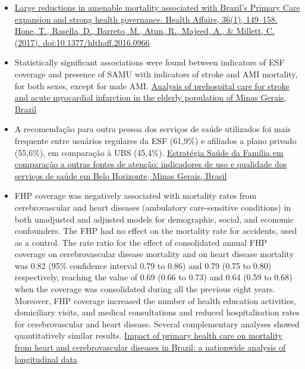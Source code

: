 \documentclass[]{book}
\begin{document}
\begin{itemize}
\item
  \href{https://www.healthaffairs.org/doi/full/10.1377/hlthaff.2016.0966?url_ver=Z39.88-2003\&rfr_id=ori:rid:crossref.org\&rfr_dat=cr_pub\%3dpubmed}{Large reductions in amenable mortality associated with Brazil's Primary Care expansion and strong health governance. Health Affairs, 36(1), 149--158. Hone, T., Rasella, D., Barreto, M., Atun, R., Majeed, A., \& Millett, C. (2017). doi:10.1377/hlthaff.2016.0966}
\item
  Statistically significant associations were found between indicators of ESF coverage and presence of SAMU with indicators of stroke and AMI mortality, for both sexes, except for male AMI. \href{http://www.scielo.br/pdf/ramb/v56n4/en_19.pdf}{Analysis of prehospital care for stroke and acute myocardial infarction in the elderly population of Minas Gerais, Brazil}
\item
  A recomendação para outra pessoa dos serviços de saúde utilizados foi mais frequente entre usuários regulares da ESF (61,9\%) e afiliados a plano privado (55,6\%), em comparação à UBS (45,4\%). \href{http://www.scielo.br/scielo.php?script=sci_arttext\&pid=S0102-311X2013000700011\&lng=en\&nrm=iso\&tlng=en}{Estratégia Saúde da Família em comparação a outras fontes de atenção: indicadores de uso e qualidade dos serviços de saúde em Belo Horizonte, Minas Gerais, Brasil}
\item
  FHP coverage was negatively associated with mortality rates from cerebrovascular and heart diseases (ambulatory care-sensitive conditions) in both unadjusted and adjusted models for demographic, social, and economic confounders. The FHP had no effect on the mortality rate for accidents, used as a control. The rate ratio for the effect of consolidated annual FHP coverage on cerebrovascular disease mortality and on heart disease mortality was 0.82 (95\% confidence interval 0.79 to 0.86) and 0.79 (0.75 to 0.80) respectively, reaching the value of 0.69 (0.66 to 0.73) and 0.64 (0.59 to 0.68) when the coverage was consolidated during all the previous eight years. Moreover, FHP coverage increased the number of health education activities, domiciliary visits, and medical consultations and reduced hospitalisation rates for cerebrovascular and heart disease. Several complementary analyses showed quantitatively similar results. \href{https://www.bmj.com/content/bmj/349/bmj.g4014.full.pdf}{Impact of primary health care on mortality from heart and cerebrovascular diseases in Brazil: a nationwide analysis of longitudinal data}

\end{itemize}
\end{document}
